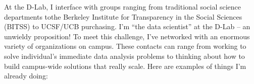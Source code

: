 




At the D-Lab, I interface with groups ranging from traditional social science
departments tothe Berkeley Institute for Transparency in the Social Sciences
(BITSS) to  UCSF/UCB purchasing. I'm “the data scientist” at the D-Lab --
an unwieldy proposition! To meet this challenge, I've networked with an enormous
variety of organizations on campus.  These contacts can range from working to
solve individual's immediate data analysis problems to thinking about how to
build campus-wide solutions that really scale. Here are examples of things I'm
already doing:

